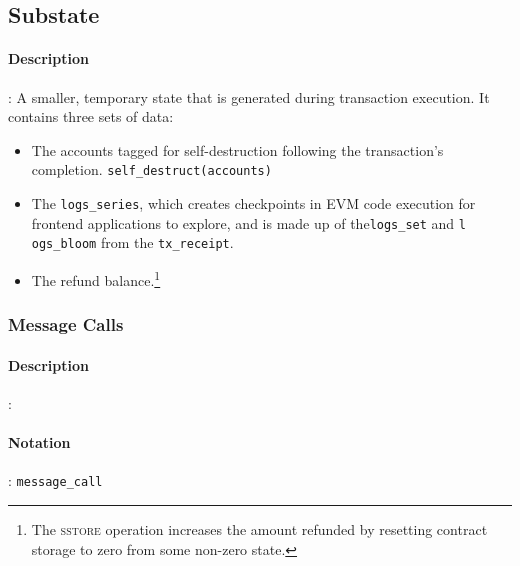 \documentclass[10pt,a4paper,leqno,bibliography=totoc]{scrartcl}
\newenvironment{alphafootnotes}
{\par\edef\savedfootnotenumber{\number\value{footnote}}
\renewcommand{\thefootnote}{\alph{footnote}}
\setcounter{footnote}{0}}
{\par\setcounter{footnote}{\savedfootnotenumber}}
\begin{document}
\begin{alphafootnotes}
\begin{multicols*}{2}
				\subsection{Substate}
				\paragraph{Description}: A smaller, temporary state that is generated during transaction execution. It contains three sets of data:

\begin{itemize}
        \item The accounts tagged for self-destruction following the transaction's completion. \texttt{self\_destruct(accounts)}
        \item The \texttt{logs\_series}, which creates checkpoints in EVM code execution for frontend applications to explore, and is made up of the\texttt{logs\_set} and \texttt{l
ogs\_bloom} from the \texttt{tx\_receipt}.
	\item The refund balance.\footnote{The \textsc{sstore} operation increases the amount refunded by resetting contract storage to zero from some non-zero state.}
\end{itemize}

			\subsubsection{Message Calls}
\paragraph{Description}:\paragraph{Notation}: \texttt{message\_call}

\end{multicols*}
\end{alphafootnotes}
\end{document}
